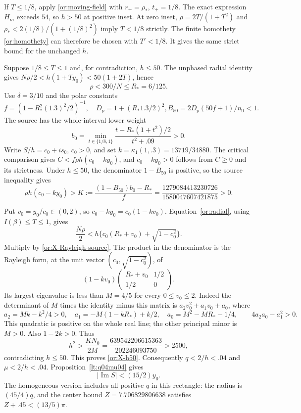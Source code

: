 \documentclass[11pt,reqno]{amsart}
\numberwithin{equation}{section}
\theoremstyle{definition}
\theoremstyle{remark}
\renewcommand{\Im}{\operatorname{Im}}
\begin{document}
If $T\le1/8$, apply \eqref{or:moving-field} with
$r_+=\rho_*$, $t_+=1/8$.  The exact expression $H_m$ exceeds $54$,
so $h>50$ at positive inset.  At zero inset,
$\rho=2T/(1+T^2)$ and
$\rho_*<2(1/8)/(1+(1/8)^2)$ imply $T<1/8$ strictly.
The finite homothety \eqref{or:homothety} can therefore be chosen
with $T'<1/8$.  It gives the same strict bound for the unchanged $h$.

Suppose $1/8\le T\le1$ and, for contradiction, $h\le50$.
The unphased radial identity gives
$N\rho/2<h(1+Ty_0)<50(1+2T)$, hence
\[
                           \rho<300/N\le R_*=6/125.
\]
Use $\delta=3/10$ and the polar constants
\[
 f=(1-R_*^2(1.3)^2/2)^{-1},\quad D_p=1+(R_*1.3/2)^2,
                 B_{50}=2D_p(50f+1)/n_0<1.
\]
The source has the whole-interval lower weight
\[
 b_0=\min_{t\in\{1/8,1\}}
                 \frac{t-R_*(1+t^2)/2}{t^2+.09}>0.
\]
Write $S/h=c_0+is_0$, $c_0>0$, and set
$k=\kappa_1(1,.3)=13719/34880$.  The critical comparison gives
$C<f\rho h(c_0-ky_0)$, and $c_0-ky_0>0$ follows from $C\ge0$
and its strictness.  Under $h\le50$, the denominator $1-B_{50}$
is positive, so the source inequality gives
\begin{equation}\label{or:X-Rayleigh-source}
 \rho h(c_0-ky_0)>K:=\frac{(1-B_{50})b_0-R_*}{f}
                 =\frac{1279084413230726}{1580047607421875}>0.
\end{equation}

Put $v_0=y_0/c_0\in(0,2)$, so $c_0-ky_0=c_0(1-kv_0)$.
Equation~\eqref{or:radial}, using $I(\beta)\le T\le1$, gives
\[
 \frac{N\rho}{2}<h\{c_0(R_*+v_0)+\sqrt{1-c_0^2}\}.
\]
Multiply by \eqref{or:X-Rayleigh-source}.
The product in the denominator is the Rayleigh form, at the unit
vector $(c_0,\sqrt{1-c_0^2})$, of
\[
             (1-kv_0)
             \begin{pmatrix}R_*+v_0&1/2\\1/2&0\end{pmatrix}.
\]
Its largest eigenvalue is less than $M=4/5$ for every
$0\le v_0\le2$.  Indeed the determinant of $M$ times the identity
minus this matrix is $a_2v_0^2+a_1v_0+a_0$, where
\[
 a_2=Mk-k^2/4>0,\quad
 a_1=-M(1-kR_*)+k/2,\quad a_0=M^2-MR_*-1/4,
 \qquad 4a_2a_0-a_1^2>0.
\]
This quadratic is positive on the whole real line; the other principal
minor is $M>0$.  Also $1-2k>0$.  Thus
\[
 h^2>\frac{KN_0}{2M}
      =\frac{639542206615363}{202246093750}>2500,
\]
contradicting $h\le50$.  This proves \eqref{or:X-h50}.
Consequently $q<2/h<.04$ and $\mu<2/h<.04$.
Proposition~\ref{lt:q04mu04} gives
\begin{equation}\label{or:X-low-phase}
                              |\Im S|<(15/2)y_0.
\end{equation}
The homogeneous version includes all positive $q$ in this rectangle:
the radius is $(45/4)q$, and the center bound
$Z=7.706829806638$ satisfies $Z+.45<(13/5)\pi$.
\end{document}
